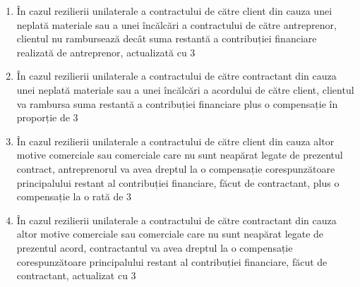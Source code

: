 \begin{multicols}{2}
\begin{enumerate}
\begin{enumerate}
\item În cazul rezilierii unilaterale a contractului de către client din cauza unei neplată materiale sau a unei încălcări a contractului de către antreprenor, clientul nu rambursează decât suma restantă a contribuției financiare realizată de antreprenor, actualizată cu 3%
\item În cazul rezilierii unilaterale a contractului de către contractant din cauza unei neplată materiale sau a unei încălcări a acordului de către client, clientul va rambursa suma restantă a contribuției financiare plus o compensație în proporție de 3%
\item În cazul rezilierii unilaterale a contractului de către client din cauza altor motive comerciale sau comerciale care nu sunt neapărat legate de prezentul contract, antreprenorul va avea dreptul la o compensație corespunzătoare principalului restant al contribuției financiare, făcut de contractant, plus o compensație la o rată de 3%
\item În cazul rezilierii unilaterale a contractului de către contractant din cauza altor motive comerciale sau comerciale care nu sunt neapărat legate de prezentul acord, contractantul va avea dreptul la o compensație corespunzătoare principalului restant al contribuției financiare, făcut de contractant, actualizat cu 3%

\end{enumerate}
\end{enumerate}
\end{multicols}

